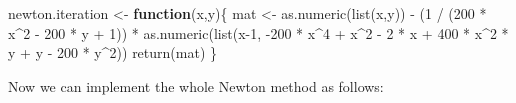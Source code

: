 \documentclass[
]{article}
\newenvironment{Shaded}{\begin{snugshade}}{\end{snugshade}}
\newcommand{\ControlFlowTok}[1]{\textcolor[rgb]{0.13,0.29,0.53}{\textbf{#1}}}
\newcommand{\DecValTok}[1]{\textcolor[rgb]{0.00,0.00,0.81}{#1}}
\newcommand{\FunctionTok}[1]{\textcolor[rgb]{0.00,0.00,0.00}{#1}}
\newcommand{\NormalTok}[1]{#1}
\newcommand{\OtherTok}[1]{\textcolor[rgb]{0.56,0.35,0.01}{#1}}
\newcommand{\SpecialCharTok}[1]{\textcolor[rgb]{0.00,0.00,0.00}{#1}}
\begin{document}
\begin{Shaded}
\begin{Highlighting}[]
\NormalTok{newton.iteration }\OtherTok{\textless{}{-}} \ControlFlowTok{function}\NormalTok{(x,y)\{}
\NormalTok{  mat }\OtherTok{\textless{}{-}} \FunctionTok{as.numeric}\NormalTok{(}\FunctionTok{list}\NormalTok{(x,y)) }\SpecialCharTok{{-}}\NormalTok{ (}\DecValTok{1} \SpecialCharTok{/}\NormalTok{ (}\DecValTok{200} \SpecialCharTok{*}\NormalTok{ x}\SpecialCharTok{\^{}}\DecValTok{2} \SpecialCharTok{{-}} \DecValTok{200} \SpecialCharTok{*}\NormalTok{ y }\SpecialCharTok{+} \DecValTok{1}\NormalTok{)) }\SpecialCharTok{*} \FunctionTok{as.numeric}\NormalTok{(}\FunctionTok{list}\NormalTok{(x}\DecValTok{{-}1}\NormalTok{, }\SpecialCharTok{{-}}\DecValTok{200} \SpecialCharTok{*}\NormalTok{ x}\SpecialCharTok{\^{}}\DecValTok{4} \SpecialCharTok{+}\NormalTok{ x}\SpecialCharTok{\^{}}\DecValTok{2} \SpecialCharTok{{-}} \DecValTok{2} \SpecialCharTok{*}\NormalTok{ x }\SpecialCharTok{+} \DecValTok{400} \SpecialCharTok{*}\NormalTok{ x}\SpecialCharTok{\^{}}\DecValTok{2} \SpecialCharTok{*}\NormalTok{ y }\SpecialCharTok{+}\NormalTok{ y }\SpecialCharTok{{-}} \DecValTok{200} \SpecialCharTok{*}\NormalTok{ y}\SpecialCharTok{\^{}}\DecValTok{2}\NormalTok{))}
  \FunctionTok{return}\NormalTok{(mat)}
\NormalTok{\}}
\end{Highlighting}
\end{Shaded}

Now we can implement the whole Newton method as follows:
\end{document}
